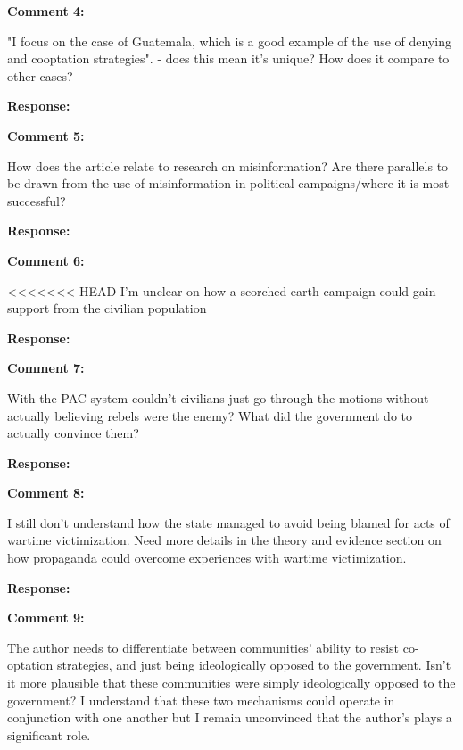 \documentclass[12pt, a4paper, notitlepage]{article}
\begin{document}
\vspace{15pt}
\noindent\textbf{Comment 4:}
\begin{displayquote}
"I focus on the case of Guatemala, which is a good example of the use of denying and cooptation strategies". - does this mean it's unique? How does it compare to other cases?
\end{displayquote}

\noindent\textbf{Response:}


\vspace{15pt}
\noindent\textbf{Comment 5:}
\begin{displayquote}
How does the article relate to research on misinformation? Are there parallels to be drawn from the use of misinformation in political campaigns/where it is most successful?
\end{displayquote}

\noindent\textbf{Response:}


\vspace{15pt}
\noindent\textbf{Comment 6:}
\begin{displayquote}
<<<<<<< HEAD
I'm unclear on how a scorched earth campaign could gain support from the civilian population
\end{displayquote}

\noindent\textbf{Response:}



\vspace{15pt}
\noindent\textbf{Comment 7:}
\begin{displayquote}
With the PAC system-couldn't civilians just go through the motions without actually believing rebels were the enemy? What did the government do to actually convince them?
\end{displayquote}

\noindent\textbf{Response:}



\vspace{15pt}
\noindent\textbf{Comment 8:}
\begin{displayquote}
I still don't understand how the state managed to avoid being blamed for acts of wartime victimization. Need more details in the theory and evidence section on how propaganda could overcome experiences with wartime victimization.
\end{displayquote}

\noindent\textbf{Response:}



\vspace{15pt}
\noindent\textbf{Comment 9:}
\begin{displayquote}
The author needs to differentiate between communities' ability to resist co-optation strategies, and just being ideologically opposed to the government. Isn't it more plausible that these communities were simply ideologically opposed to the government? I understand that these two mechanisms could operate in conjunction with one another but I remain unconvinced that the author's plays a significant role.
\end{displayquote}
\end{document}
